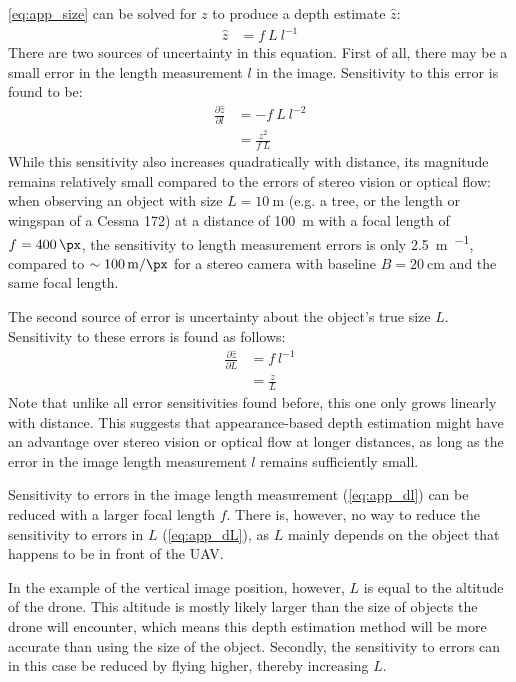 \autoref{eq:app_size} can be solved for $z$ to produce a depth estimate $\hat z$:
\begin{align}
\hat z &= f \ L \ l^{-1}
\end{align}
There are two sources of uncertainty in this equation.
First of all, there may be a small error in the length measurement $l$ in the image.
Sensitivity to this error is found to be:
\begin{align}
\frac{\partial \hat z}{\partial l} &= -f \ L \ l^{-2} \\
&= \frac{z^2}{f\ L} \label{eq:app_dl}
\end{align}
While this sensitivity also increases quadratically with distance, its magnitude remains relatively small compared to the errors of stereo vision or optical flow: when observing an object with size $L=\SI{10}{\m}$ (e.g. a tree, or the length or wingspan of a Cessna 172) at a distance of \SI{100}{\m} with a focal length of $f=\SI{400}{\px}$, the sensitivity to length measurement errors is only \SI{2.5}{\m\per\px}, compared to $\sim\SI{100}{\m\per\px}$ for a stereo camera with baseline $B=\SI{20}{\centi\m}$ and the same focal length.

The second source of error is uncertainty about the object's true size $L$.
Sensitivity to these errors is found as follows:
\begin{align}
\frac{\partial \hat z}{\partial L} &= f \ l^{-1} \\
&= \frac{z}{L} \label{eq:app_dL}
\end{align}
Note that unlike all error sensitivities found before, this one only grows linearly with distance.
This suggests that appearance-based depth estimation might have an advantage over stereo vision or optical flow at longer distances, as long as the error in the image length measurement $l$ remains sufficiently small.

Sensitivity to errors in the image length measurement (\autoref{eq:app_dl}) can be reduced with a larger focal length $f$.
There is, however, no way to reduce the sensitivity to errors in $L$ (\autoref{eq:app_dL}), as $L$ mainly depends on the object that happens to be in front of the \ac{UAV}.

In the example of the vertical image position, however, $L$ is equal to the altitude of the drone.
This altitude is mostly likely larger than the size of objects the drone will encounter, which means this depth estimation method will be more accurate than using the size of the object.
Secondly, the sensitivity to errors can in this case be reduced by flying higher, thereby increasing $L$.

